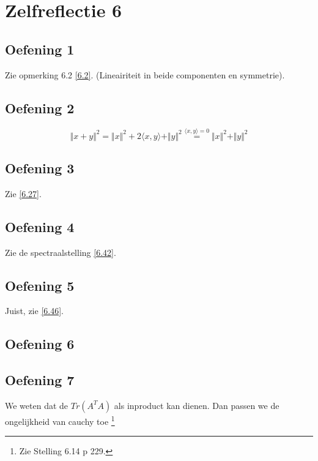 \documentclass[lineaire_algebra_oplossingen.tex]{subfiles}
\begin{document}
\section{Zelfreflectie 6}
\subsection{Oefening 1}
Zie opmerking 6.2 \ref{6.2}. (Lineairiteit in beide componenten en symmetrie).

\subsection{Oefening 2}
\[
\Vert x+y \Vert^2 = \Vert x\Vert^2 + 2\langle x,y \rangle+ \Vert y\Vert^2 \overset{\langle x,y \rangle = 0}{=}\Vert x\Vert^2 + \Vert y\Vert^2
\]

\subsection{Oefening 3}
Zie \ref{6.27}.

\subsection{Oefening 4}
Zie de spectraalstelling \ref{6.42}.

\subsection{Oefening 5}
Juist, zie \ref{6.46}.

\subsection{Oefening 6}

\subsection{Oefening 7}
We weten dat de $Tr(A^T A)$ als inproduct kan dienen. Dan passen we de ongelijkheid van cauchy toe \footnote{Zie Stelling 6.14 p 229.}
\end{document}

